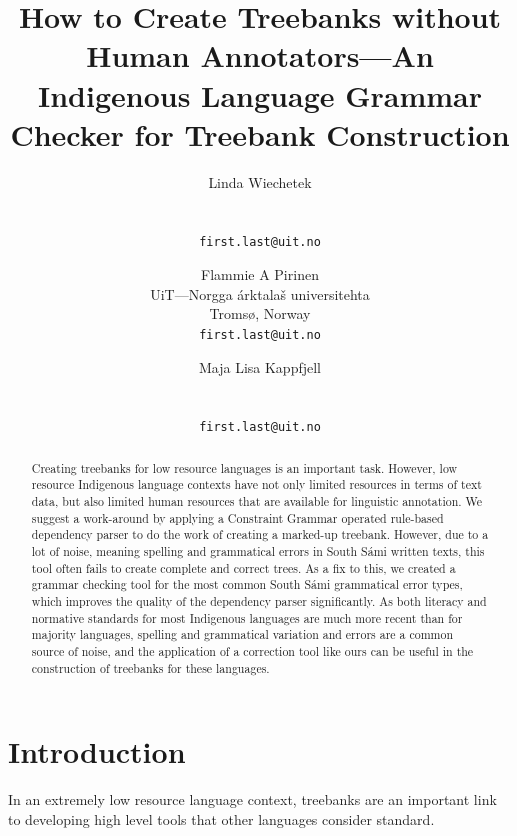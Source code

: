 \documentclass[free]{flammie}
\title{How to Create Treebanks without Human Annotators---An Indigenous
Language Grammar Checker for Treebank
Construction\footnotepubrights{\aclanthologypostprintdoi{2025.tlt-1.14}}
    }
\author{Linda Wiechetek \\
   \\
   \\
  \texttt{first.last@uit.no} \\\and%
  Flammie A Pirinen  \\
  UiT---Norgga árktalaš universitehta \\
  Tromsø, Norway \\
  \texttt{first.last@uit.no} \\\and%
  Maja Lisa Kappfjell \\
   \\
   \\
  \texttt{first.last@uit.no}
  }
\begin{document}
\maketitle
\begin{abstract}
   Creating treebanks for low resource languages is an important task.  However,
    low resource Indigenous language contexts have not only limited resources in
    terms of text data, but also limited human resources that are available for
    linguistic annotation.  We suggest a work-around by applying a Constraint
    Grammar operated rule-based dependency parser to do the work of creating a
    marked-up treebank. However, due to a lot of noise, meaning spelling and
    grammatical errors in South Sámi written texts, this tool often fails to
    create complete and correct trees.  As a fix to this, we created a grammar
    checking tool for the most common South Sámi grammatical error types, which
    improves the quality of the dependency parser significantly.  As both
    literacy and normative standards for most Indigenous languages are much more
    recent than for majority languages, spelling and grammatical variation and
    errors are a common source of noise, and the application of a correction
    tool like ours can be useful in the construction of treebanks for these
    languages.
\end{abstract}


\section{Introduction}

In an extremely low resource language context, treebanks are an important link
to developing high level tools that other languages consider standard.
\end{document}
